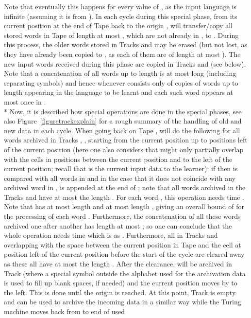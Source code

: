 \documentclass{LMCS}
\theoremstyle{plain}\newtheorem{athm}[thm]{Theorem}
\theoremstyle{plain}\newtheorem{aprop}[thm]{Proposition}
\theoremstyle{plain}\newtheorem{aprob}[thm]{Open Problem}
\theoremstyle{plain}\newtheorem{acor}[thm]{Corollary}
\theoremstyle{plain}\newtheorem{alem}[thm]{Lemma}
\theoremstyle{definition}\newtheorem{adefn}[thm]{Definition}
\theoremstyle{definition}\newtheorem{arem}[thm]{Remark}
\theoremstyle{plain}\newtheorem{aexmp}[thm]{Example}
\theoremstyle{plain}\newtheorem{aclm}[thm]{Claim}
\def\sp{\\*\indent}
\begin{document}
Note that eventually this happens for every value of , as the input
language is infinite (assuming it is from ).
In each cycle during this special phase, 
from its current position at the end of Tape  back
to the origin ,  will transfer/copy all stored words in 
Tape  of length at most
, which are not already in , to .
During this process, the older words stored in Tracks  and  may be 
erased (but not lost, as they have already been copied to , as each
of them are of length at most ). The new input words received during
this phase are copied in Tracks  and  (see below).
Note that a concatenation of
all words up to length  is at most  long (including
separating symbols) and hence  whenever
 consists only of copies of words up to length  appearing in the
language to be learnt and each such word appears at most once in .
\sp
Now, it is described how special operations are done in the special phases,
see also Figure~\ref{figuretrackexplain} for a rough summary of the
handling of old and new data in each cycle.
When going back on Tape ,  will do the following for all words 
 archived in Tracks , ,  starting from the current position up to 
 positions left of the current position (here 
one also considers  that might only partially
overlap with the cells in positions between the current position and
 to the left of the current position; recall that  is the current
input data to the learner): 
if  then  is compared
with all words in  and in the case that it does not coincide with
any archived word in ,  is appended at the end of
; note that
all words archived in the Tracks  and  have at most the length .
For each word , this operation needs time .
Note that  has at most length  and  at most length
, giving an overall bound of
 for the processing of each word .
Furthermore, the concatenation
of all these words archived one after another has length at most ;
so one can conclude that the whole operation needs time
 which is  as
. Furthermore, all  in Tracks 
and  overlapping with the space between the current position in Tape 
and the cell at position  left of the current position
before the start of the cycle are cleared away as these  all have
at most the length . After the clearance,  will be archived in
Track  (where a special symbol outside the alphabet used for the
archivation data is used to fill up blank spaces, if needed)
and the current position moves by  to the left.
This is done until the origin  is reached.
At this point, Track  is empty and
can be used to archive the incoming data in a similar
way while the Turing machine moves back from  to end of used
\end{document}
